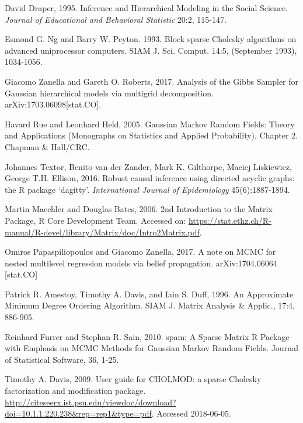 \documentclass[]{article}
\begin{document}
David Draper, 1995. Inference and Hierarchical Modeling in the Social
Science. \emph{Journal of Educational and Behavioral Statistic} 20:2,
115-147.

Esmond G. Ng and Barry W. Peyton. 1993. Block sparse Cholesky algorithms
on advanced uniprocessor computers. SIAM J. Sci. Comput. 14:5,
(September 1993), 1034-1056.

Giacomo Zanella and Gareth O. Roberts, 2017. Analysis of the Gibbs
Sampler for Gaussian hierarchical models via multigrid decomposition.
arXiv:1703.06098{[}stat.CO{]}.

Havard Rue and Leonhard Held, 2005. Gaussian Markov Random Fields:
Theory and Applications (Monographs on Statistics and Applied
Probability), Chapter 2. Chapman \& Hall/CRC.

Johannes Textor, Benito van der Zander, Mark K. Gilthorpe, Maciej
Liskiewicz, George T.H. Ellison, 2016. Robust causal inference using
directed acyclic graphs: the R package `dagitty'. \emph{International
Journal of Epidemiology} 45(6):1887-1894.

Martin Maechler and Douglas Bates, 2006. 2nd Introduction to the Matrix
Package, R Core Development Team. Accessed on:
\url{https://stat.ethz.ch/R-manual/R-devel/library/Matrix/doc/Intro2Matrix.pdf}.

Omiros Papaspiliopoulos and Giacomo Zanella, 2017. A note on MCMC for
nested multilevel regression models via belief propagation.
arXiv:1704.06064 {[}stat.CO{]}

Patrick R. Amestoy, Timothy A. Davis, and Iain S. Duff, 1996. An
Approximate Minimum Degree Ordering Algorithm. SIAM J. Matrix Analysis
\& Applic., 17:4, 886-905.

Reinhard Furrer and Stephan R. Sain, 2010. spam: A Sparse Matrix R
Package with Emphasis on MCMC Methods for Gaussian Markov Random Fields.
Journal of Statistical Software, 36, 1-25.

Timothy A. Davis, 2009. User guide for CHOLMOD: a sparse Cholesky
factorization and modification package.
\url{http://citeseerx.ist.psu.edu/viewdoc/download?doi=10.1.1.220.238\&rep=rep1\&type=pdf}.
Accessed 2018-06-05.
\end{document}
